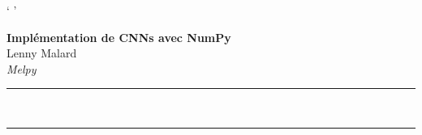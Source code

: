\documentclass[a4paper,12pt]{article}
\renewenvironment{abstract}
 {\par\noindent\textbf{\abstractname}\ \ignorespaces \\}
 {\par\noindent\medskip}
\begin{document}
\pagestyle{fancy}
\thispagestyle{empty}
\fancyfoot[L]{\thepage}`
\fancyfoot[C]{}'
\fancyhead{}
\renewcommand*{\thefootnote}{\fnsymbol{footnote}}
\begin{center}
\Large{\textbf{Implémentation de CNNs avec NumPy}}
\vspace{0.4cm}
\normalsize
\\ Lenny Malard \\
\vspace{0.1cm}
\textit{Melpy}
\medskip
\normalsize
\end{center}
{\color{gray}\hrule}
\vspace{0.4cm}
\begin{abstract}

\end{abstract}
\renewcommand{\contentsname}{Table des matières}
{\color{gray}\hrule}
\medskip







\end{document}
